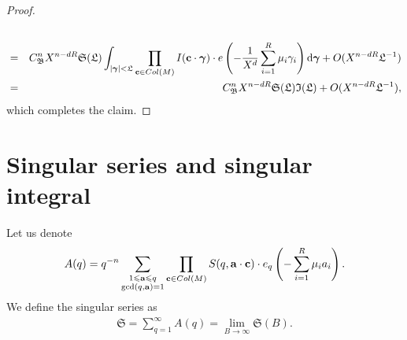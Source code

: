 \documentclass[reqno, 12pt, reqno]{amsart}
\numberwithin{equation}{section}
\renewcommand{\leq}{\leqslant}
\newcommand{\x}{\mathbf{x}}
\renewcommand{\c}{\mathbf{c}}
\renewcommand{\a}{\mathbf{a}}
\newcommand{\bgamma}{\boldsymbol{\gamma}}
\DeclareMathOperator{\Mod}{mod}
\renewcommand{\bmod}[1]{\,(\Mod{#1})}
\renewcommand{\=}{\equiv}
\newcommand{\sumstar}{\sideset{}{^*}\sum}
\begin{document}
\begin{proof}
\begin{eqnarray}
\\
\notag
&=&
C_{\mathfrak{B}}^n  X^{n- d R }  \mathfrak{S} (\mathfrak{L}) \int_{\vert \bgamma \vert <  \mathfrak{L} }
\prod_{\c \in \textnormal{Col}( M )} I( \c\cdot \bgamma )  \cdot   e \left( - \frac{ 1 }{X^d}   \sum_{i=1}^{R}  \mu_i \gamma_i    \right) \mathrm{d}\bgamma
+ O ( X^{ n - d R} \mathfrak{L}^{ -1 } )
\\
\notag
&=&
C_{\mathfrak{B}}^n  X^{n - d R} \mathfrak{S} (\mathfrak{L}) \mathfrak{I} (\mathfrak{L}) + O ( X^{ n - d R} \mathfrak{L}^{ -1 }),
\end{eqnarray}
which completes the claim.
\end{proof}



\section{Singular series and singular integral}
Let us denote
$$
A (q) = q^{- n }  \sum_{ \substack{ 1 \leq  \a \leq  q \\ \gcd(q, \a) = 1  } } \prod_{\c \in \textnormal{Col}( M ) } S(q, \a\cdot\c) \cdot  e_q \left(  -   \sum_{i = 1}^{R} \mu_i a_i \right).
$$
We define the singular series as
\begin{eqnarray}
\label{singser}
\mathfrak{S}  = \sum_{q =1}^\infty A (q) = \lim_{B \rightarrow \infty} \mathfrak S(B).
\end{eqnarray}
\end{document}

